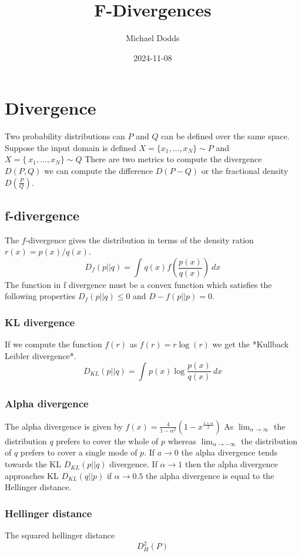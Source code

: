 \documentclass{article}
\title{F-Divergences}
\author{Michael Dodds}
\date{2024-11-08}
\begin{document}
\section{Divergence}%
\label{sec:Divergence}
Two probability distributions can \(P\) and \(Q\) can be defined over the same space. Suppose the input domain is defined \(X=\{x_1,...,x_N\}\sim{P}\) and \(X=\{~x_1,...,x_N\}\sim{Q}\)
There are two metrics to compute the divergence \(D(P, Q)\) we can compute the difference \(D(P-Q)\) or the fractional density \(D(\frac{P}{Q})\).
\subsection{f-divergence}%
\label{sub:f-divergence}
The \(f\)-divergence gives the distribution in terms of the density ration \(r(x) = p(x) / q(x)\). 
\[
	D_f(p||q)=\int_{{}}^{{}} {q(x)f(\frac{p(x)}{q(x)})} \: d{x} {}
\]
The function in f divergence must be a convex function which satisfies the following properties 
\(D_f(p||q)\leq{0}\) and \(D-f(p||p) = 0\). 
\subsubsection{KL divergence}%
\label{ssub:KL divergence}
If we compute the function \(f(r)\) as \(f(r) = r\log(r)\) we get the *Kullback Leibler divergence*.
\[
	D_{KL}(p||q) = \int_{{}}^{{}} {p(x)\log\frac{p(x)}{q(x)}} \: d{x} {}
\]
\subsubsection{Alpha divergence}%
\label{ssub:Alpha divergence}
The alpha divergence is given by \(f(x)=\frac{4}{1-\alpha^2}(1-x^{\frac{1+\alpha}{2}})\)
As \(\lim_{\alpha \to \infty} \) the distribution \(q\) prefers to cover the whole of \(p\)
whereas \(\lim_{\alpha \to -\infty} \) the distribution of \(q\) prefers to cover a single mode of \(p\).
If \(a \rightarrow {0}\) the alpha divergence tends towards the KL \(D_{KL}(p||q)\) divergence. 
If \(\alpha \rightarrow {1}\) then the alpha divergence approaches KL \(D_{KL}(q||p)\)
if \(\alpha \rightarrow {0.5}\) the alpha divergence is equal to the Hellinger distance.
\subsubsection{Hellinger distance}%
\label{ssub:Hellinger distance}
The squared hellinger distance \[
	D^2_H(P)
\]
\end{document}
